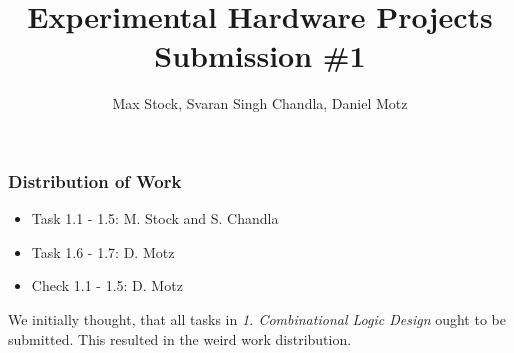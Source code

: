\documentclass[runningheads]{llncs}
\begin{document}
%
\title{Experimental Hardware Projects Submission \#1}
%
%
\author{Max Stock, Svaran Singh Chandla, Daniel Motz}
%
%
%
\maketitle              %
%
\begin{abstract}
\end{abstract}
%
%
%
\subsubsection{Distribution of Work}
\begin{itemize}
    \item Task 1.1 - 1.5: M. Stock and S. Chandla
    \item Task 1.6 - 1.7: D. Motz
    \item Check 1.1 - 1.5: D. Motz
\end{itemize}

\noindent We initially thought, that all tasks in \textit{1. Combinational Logic Design} ought to be submitted. This resulted in the weird work distribution.
\end{document}
